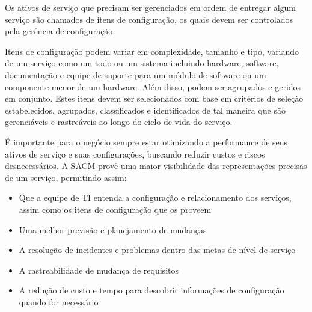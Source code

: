 Os ativos de serviço que precisam ser gerenciados em ordem de entregar algum serviço são chamados de itens de configuração, os quais devem ser controlados pela gerência de configuração.

Itens de configuração podem variar em complexidade, tamanho e tipo, variando de um serviço como um todo ou um sistema incluindo hardware, software, documentação e equipe de suporte para um módulo de software ou um componente menor de um hardware. Além disso, podem ser agrupados e geridos em conjunto. Estes itens devem ser selecionados com base em critérios de seleção estabelecidos, agrupados, classificados e identificados de tal maneira que são gerenciáveis e rastreáveis ao longo do ciclo de vida do serviço\cite{itil2011}.

É importante para o negócio sempre estar otimizando a performance de seus ativos de serviço e suas configurações, buscando reduzir custos e riscos desnecessários. A SACM provê uma maior visibilidade das representações precisas de um serviço, permitindo assim\cite{itil2011}:

\begin{itemize}
\item Que a equipe de TI entenda a configuração e relacionamento dos serviços, assim como os itens de configuração que os proveem
\item Uma melhor previsão e planejamento de mudanças
\item A resolução de incidentes e problemas dentro das metas de nível de serviço
\item A rastreabilidade de mudança de requisitos
\item A redução de custo e tempo para descobrir informações de configuração quando for necessário
\end{itemize}
